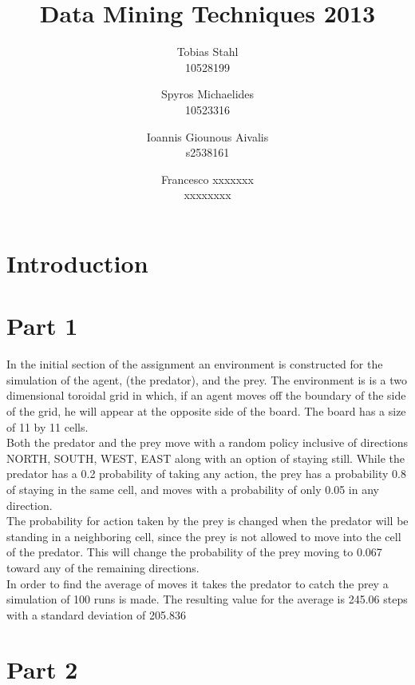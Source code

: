 \documentclass[11pt]{article}
\title{
	\textbf{Data Mining Techniques 2013}
}
\author{Tobias Stahl \\ 10528199 \and Spyros Michaelides \\ 10523316 \and Ioannis Giounous Aivalis \\ s2538161 \and Francesco xxxxxxx \\ xxxxxxxx}
\date{}
\begin{document}
\maketitle

\section{Introduction}



\section{Part 1}

In the initial section of the assignment an environment is constructed for the simulation of the agent, (the predator), and the prey. The environment is is a two dimensional toroidal grid in which, if an agent moves off the boundary of the side of the grid, he will appear at the opposite side of the board. The board has a size of 11 by 11 cells.\\
Both the predator and the prey move with a random policy inclusive of directions NORTH, SOUTH, WEST, EAST along with an option of staying still. While the predator has a 0.2 probability of taking any action, the prey has a probability 0.8 of staying in the same cell, and moves with a probability of only 0.05 in any direction.\\
The probability for action taken by the prey is changed when the predator will be standing in a neighboring cell, since the prey is not allowed to move into the cell of the predator. This will change the probability of the prey moving to 0.067 toward any of the remaining directions.\\
In order to find the average of moves it takes the predator to catch the prey a simulation of 100 runs is made. The resulting value for the average is 245.06 steps with a standard deviation of 205.836



\section{Part 2}
\end{document}
